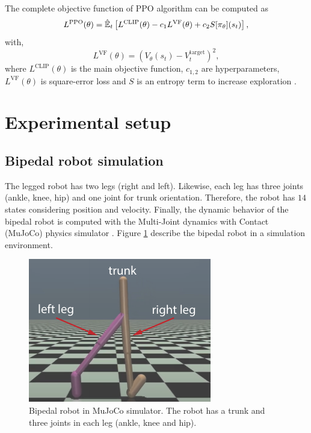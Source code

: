 The complete objective function of PPO algorithm can be computed as
\begin{equation*}
	L^{\mathrm{PPO}}(\theta) = \hat{\mathbb{E}}_{t} \left[  L^{\mathrm{CLIP}}(\theta) - c_1 L^{\mathrm{VF}}(\theta)  + c_2 S[\pi_\theta](s_t)  \right],			
\end{equation*}	
with,
\begin{equation*}
	L^{\mathrm{VF}}(\theta) = \left( V_\theta (s_t) - V^{\mathrm{target}}_{t}  \right)^{2},	
\end{equation*}			
\noindent where $L^{\mathrm{CLIP}}(\theta)$ is the main objective function, $c_{1,2}$ are hyperparameters, $L^{\mathrm{VF}}(\theta)$ is square-error loss and $S$ is an entropy term to increase exploration \cite{schulman2017proximal}.

\section{Experimental setup}

\subsection{Bipedal robot simulation}
The legged robot has two legs (right and left). Likewise, each leg has three joints (ankle, knee, hip) and one joint for trunk orientation. Therefore, the robot has $14$ states considering position and velocity. Finally, the dynamic behavior of the bipedal robot is computed with the Multi-Joint dynamics with Contact (MuJoCo) physics simulator \cite{todorov2012mujoco}. Figure \ref{fig:bipedal_robot} describe the bipedal robot in a simulation environment.

\begin{figure}
	\centering
	\includegraphics{bipedal_robot.pdf}
	\caption{Bipedal robot in MuJoCo simulator. The robot has a trunk and three joints in each leg (ankle, knee and hip).}
	\label{fig:bipedal_robot}
\end{figure}	

